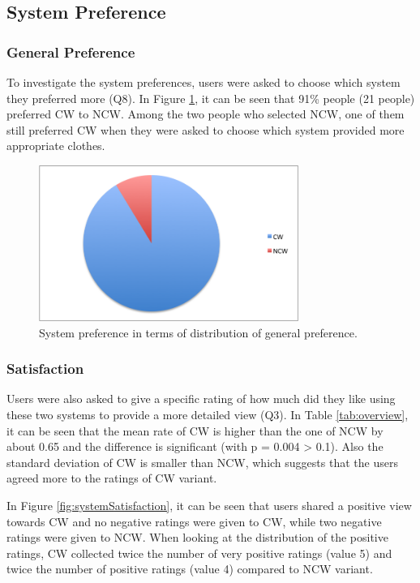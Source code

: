 \subsection{System Preference} \label{sec:results_sp}

\subsubsection{General Preference} \label{sec:results_sp_gp}

To investigate the system preferences, users were asked to choose which system they preferred more (Q8). In Figure \ref{fig:generalPreference}, it can be seen that 91\% people (21 people) preferred CW to NCW. Among the two people who selected NCW, one of them still preferred CW when they were asked to choose which system provided more appropriate clothes.

\begin{figure}[H]
	\centering
	\includegraphics[height=2in]{figures/generalPreference.png}
	\caption{System preference in terms of distribution of general preference.}
	\label{fig:generalPreference}
\end{figure}


\subsubsection{Satisfaction} \label{sec:results_sp_s}

Users were also asked to give a specific rating of how much did they like using these two systems to provide a more detailed view (Q3). In Table \ref{tab:overview}, it can be seen that the mean rate of CW is higher than the one of NCW by about 0.65 and the difference is significant (with p = 0.004 > 0.1). Also the standard deviation of CW is smaller than NCW, which suggests that the users agreed more to the ratings of CW variant.

In Figure \ref{fig:systemSatisfaction}, it can be seen that users shared a positive view towards CW and no negative ratings were given to CW, while two negative ratings were given to NCW. When looking at the distribution of the positive ratings, CW collected twice the number of very positive ratings (value 5) and twice the number of positive ratings (value 4) compared to NCW variant. 

